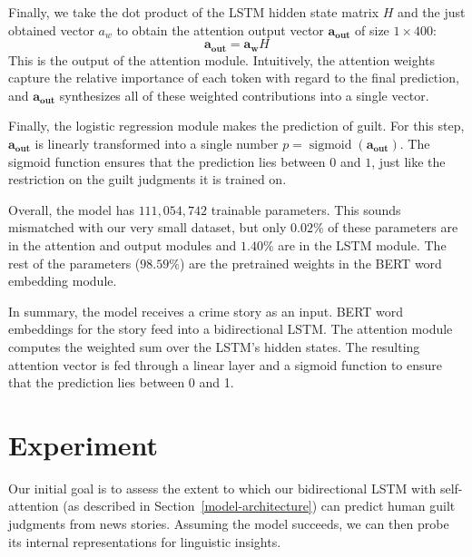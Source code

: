\documentclass[11pt,a4paper]{article}
\DeclareMathOperator{\sigmoid}{sigmoid}
\newcommand{\aout}{\mathbf{a_{\text{out}}}}
\begin{document}
Finally, we take the dot product of the LSTM hidden state matrix $H$ and the just obtained vector $a_w$ to obtain the attention output vector $\aout$ of size $1 \times 400$:
%
\begin{equation}
  \aout = \mathbf{a_w}H \label{eq:aout}
\end{equation}
%
This is the output of the attention module. Intuitively, the attention weights capture the relative importance of each token with regard to the final prediction, and $\aout$ synthesizes all of these weighted contributions into a single vector.

Finally, the logistic regression module makes the prediction of guilt. For this step, $\aout$ is linearly transformed into a single number $p = \sigmoid(\aout)$. The sigmoid function ensures that the prediction lies between $0$ and $1$, just like the restriction on the guilt judgments it is trained on.

Overall, the model has $111,054,742$ trainable parameters. This sounds mismatched with our very small dataset, but only $0.02\%$ of these parameters are in the attention and output modules and $1.40\%$ are in the LSTM module. The rest of the parameters ($98.59\%$) are the pretrained weights in the BERT word embedding module.

In summary, the model receives a crime story as an input. BERT word embeddings for the story feed into a bidirectional LSTM. The attention module computes the weighted sum over the LSTM's hidden states. The resulting attention vector is fed through a linear layer and a sigmoid function to ensure that the prediction lies between 0 and 1.




\section{Experiment}

Our initial goal is to assess the extent to which our bidirectional LSTM with self-attention (as described in Section~\ref{model-architecture}) can predict human guilt judgments from news stories. Assuming the model succeeds, we can then probe its internal representations for linguistic insights.
\end{document}
